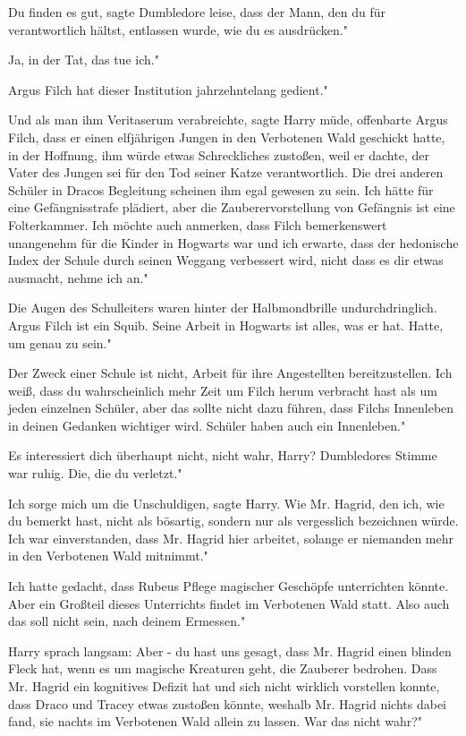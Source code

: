 \glqq{}Du finden es gut\grqq{}, sagte Dumbledore leise, \glqq{}dass der Mann, den
du für verantwortlich hältst, entlassen wurde, wie du es ausdrücken."

\glqq{}Ja, in der Tat, das tue ich."

\glqq{}Argus Filch hat dieser Institution jahrzehntelang gedient."

\glqq{}Und als man ihm Veritaserum verabreichte\grqq{}, sagte Harry müde, \glqq{}
offenbarte Argus Filch, dass er einen elfjährigen Jungen in den Verbotenen Wald
geschickt hatte, in der Hoffnung, ihm würde etwas Schreckliches zustoßen, weil
er dachte, der Vater des Jungen sei für den Tod seiner Katze verantwortlich. Die
drei anderen Schüler in Dracos Begleitung scheinen ihm egal gewesen zu sein. Ich
hätte für eine Gefängnisstrafe plädiert, aber die Zauberervorstellung von
Gefängnis ist eine Folterkammer. Ich möchte auch anmerken, dass Filch
bemerkenswert unangenehm für die Kinder in Hogwarts war und ich erwarte, dass
der hedonische Index der Schule durch seinen Weggang verbessert wird, nicht dass
es dir etwas ausmacht, nehme ich an."

Die Augen des Schulleiters waren hinter der Halbmondbrille undurchdringlich.
\glqq{}Argus Filch ist ein Squib. Seine Arbeit in Hogwarts ist alles, was er hat.
Hatte, um genau zu sein."

\glqq{}Der Zweck einer Schule ist nicht, Arbeit für ihre Angestellten
bereitzustellen. Ich weiß, dass du wahrscheinlich mehr Zeit um Filch herum
verbracht hast als um jeden einzelnen Schüler, aber das sollte nicht dazu
führen, dass Filchs Innenleben in deinen Gedanken wichtiger wird. Schüler haben
auch ein Innenleben."

\glqq{}Es interessiert dich überhaupt nicht, nicht wahr, Harry?\grqq{}
Dumbledores Stimme war ruhig. \glqq{}Die, die du verletzt."

\glqq{}Ich sorge mich um die Unschuldigen\grqq{}, sagte Harry. \glqq{}Wie Mr.
Hagrid, den ich, wie du bemerkt hast, nicht als bösartig, sondern nur als
vergesslich bezeichnen würde. Ich war einverstanden, dass Mr. Hagrid hier
arbeitet, solange er niemanden mehr in den Verbotenen Wald mitnimmt."

\glqq{}Ich hatte gedacht, dass Rubeus Pflege magischer Geschöpfe unterrichten
könnte. Aber ein Großteil dieses Unterrichts findet im Verbotenen Wald statt.
Also auch das soll nicht sein, nach deinem Ermessen."

Harry sprach langsam: \glqq{}Aber - du hast uns gesagt, dass Mr. Hagrid einen
blinden Fleck hat, wenn es um magische Kreaturen geht, die Zauberer bedrohen.
Dass Mr. Hagrid ein kognitives Defizit hat und sich nicht wirklich vorstellen
konnte, dass Draco und Tracey etwas zustoßen könnte, weshalb Mr. Hagrid nichts
dabei fand, sie nachts im Verbotenen Wald allein zu lassen. War das nicht wahr?"


